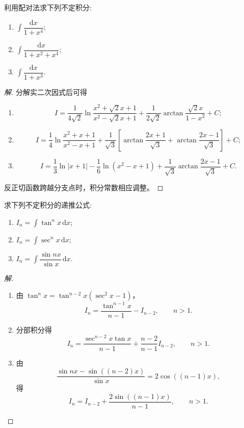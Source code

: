 \documentclass[../../数学分析培优讲义(答案版).tex]{subfiles}
\begin{document}
\begin{example}
利用配对法求下列不定积分:
\begin{enumerate}[label=(\arabic*)]
    \item $\displaystyle\int\dfrac{\mathrm{d}x}{1+x^4}$;
    \item $\displaystyle\int\dfrac{\mathrm{d}x}{1+x^2+x^4}$;
    \item $\displaystyle\int\dfrac{\mathrm{d}x}{1+x^3}$.
\end{enumerate}
\end{example}

\begin{proof}[解]
分解实二次因式后可得
\begin{enumerate}[label=(\arabic*)]
    \item
    \[
        I=\dfrac{1}{4\sqrt2}\ln\dfrac{x^2+\sqrt2x+1}{x^2-\sqrt2x+1}
        +\dfrac{1}{2\sqrt2}\arctan\dfrac{\sqrt2x}{1-x^2}+C;
    \]
    \item
    \[
        I=\dfrac{1}{4}\ln\dfrac{x^2+x+1}{x^2-x+1}
        +\dfrac{1}{\sqrt3}\left[
        \arctan\dfrac{2x+1}{\sqrt3}
        +\arctan\dfrac{2x-1}{\sqrt3}\right]+C;
    \]
    \item
    \[
        I=\dfrac{1}{3}\ln|x+1|-\dfrac{1}{6}\ln(x^2-x+1)
        +\dfrac{1}{\sqrt3}\arctan\dfrac{2x-1}{\sqrt3}+C.
    \]
\end{enumerate}
反正切函数跨越分支点时，积分常数相应调整。
\end{proof}


\begin{example}
求下列不定积分的递推公式:
\begin{enumerate}[label=(\arabic*)]
    \item $\displaystyle I_n=\int\tan^n x\,\mathrm{d}x$;
    \item $\displaystyle I_n=\int\sec^n x\,\mathrm{d}x$;
    \item $\displaystyle I_n=\int\dfrac{\sin nx}{\sin x}\,\mathrm{d}x$.
\end{enumerate}
\end{example}

\begin{proof}[解]
\begin{enumerate}[label=(\arabic*)]
    \item 由 $\tan^n x=\tan^{n-2}x(\sec^2x-1)$，
    \[
        I_n=\dfrac{\tan^{n-1}x}{n-1}-I_{n-2},
        \qquad n>1.
    \]
    \item 分部积分得
    \[
        I_n=\dfrac{\sec^{n-2}x\tan x}{n-1}
        +\dfrac{n-2}{n-1}I_{n-2},
        \qquad n>1.
    \]
    \item 由
    \[
        \dfrac{\sin nx-\sin((n-2)x)}{\sin x}=2\cos((n-1)x),
    \]
    得
    \[
        I_n=I_{n-2}+\dfrac{2\sin((n-1)x)}{n-1},
        \qquad n>1.
    \]
\end{enumerate}
\end{proof}
\end{document}
